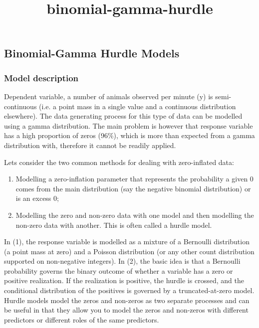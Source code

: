 \documentclass[11pt]{article}
\title{binomial-gamma-hurdle}
\providecommand{\tightlist}{%
      \setlength{\itemsep}{0pt}\setlength{\parskip}{0pt}}
\begin{document}
    
    
    \maketitle
    
    

    
    \subsection{Binomial-Gamma Hurdle
Models}\label{binomial-gamma-hurdle-models}

    \subsubsection{Model description}\label{model-description}

Dependent variable, a number of animals observed per minute (y) is
semi-continuous (i.e. a point mass in a single value and a continuous
distribution elsewhere). The data generating process for this type of
data can be modelled using a gamma distribution. The main problem is
however that response variable has a high proportion of zeros (96\%),
which is more than expected from a gamma distribution with, therefore it
cannot be readily applied.

Lets consider the two common methods for dealing with zero-inflated
data:

\begin{enumerate}
\def\labelenumi{(\arabic{enumi})}
\tightlist
\item
  Modelling a zero-inflation parameter that represents the probability a
  given 0 comes from the main distribution (say the negative binomial
  distribution) or is an excess 0;
\item
  Modelling the zero and non-zero data with one model and then modelling
  the non-zero data with another. This is often called a hurdle model.
\end{enumerate}

In (1), the response variable is modelled as a mixture of a Bernoulli
distribution (a point mass at zero) and a Poisson distribution (or any
other count distribution supported on non-negative integers). In (2),
the basic idea is that a Bernoulli probability governs the binary
outcome of whether a variable has a zero or positive realization. If the
realization is positive, the hurdle is crossed, and the conditional
distribution of the positives is governed by a truncated-at-zero model.
Hurdle models model the zeros and non-zeros as two separate processes
and can be useful in that they allow you to model the zeros and
non-zeros with different predictors or different roles of the same
predictors.
\end{document}
